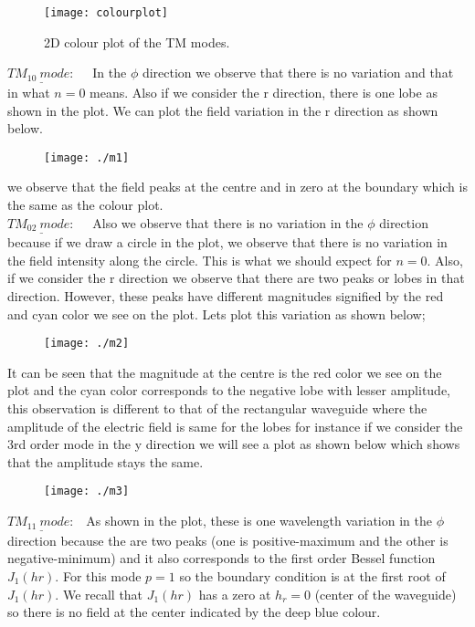       \begin{figure}[H]
      	\centering
      	\texttt{[image: colourplot]}
      	\caption{2D colour plot of the TM modes.}
      	\label{fig:colourplot}
      \end{figure}
      
      $\underline{TM_{10} \ mode:}$ \ \ In the $\phi$ direction we observe that there is no variation and that in what $n=0$ means. Also if we consider the r direction, there is one lobe as shown in the plot. We can plot the field variation  in the r direction as shown below.
      \begin{figure}[H]
      	\centering
      	\texttt{[image: ./m1]}
      	\caption{}
      	\label{fig:m1}
      \end{figure}
  	  we observe that the field peaks at the centre and in zero at the boundary which is the same as the colour plot.\\
      
      $\underline{TM_{02} \ mode:}$ \ \ Also we observe that there is no variation in the $\phi$ direction because if we draw a circle in the plot, we observe that there is no variation in the field intensity along the circle. This is what we should expect for $n =0$. Also, if we consider the r direction we observe that there are two peaks or lobes in that direction. However, these peaks have different magnitudes signified by the red and cyan color we see on the plot. Lets plot this variation as shown below;%
      \begin{figure}[H]
      	\centering
      	\texttt{[image: ./m2]}
      	\caption{}
      	\label{fig:m2}
      \end{figure}
      It can be seen that the magnitude at the centre is the red color we see on the plot and the cyan color corresponds to the negative lobe with lesser amplitude, this observation is different to that of the rectangular waveguide where the amplitude of the  electric field is same for the lobes for instance if we consider the 3rd order mode in the y direction we will see a plot as shown below which shows that the amplitude stays the same.
      \begin{figure}[H]
      	\centering
      	\texttt{[image: ./m3]}
      	\caption{}
      	\label{fig:m3}
      \end{figure}
      $\underline{TM_{11} \ mode:}$ \ As shown in the plot, these is one wavelength variation in the $\phi$ direction because the are two peaks (one is positive-maximum and the other is negative-minimum) and it also corresponds to the first order Bessel function $J_1(hr)$. For this mode $p =1$  so the boundary condition is at the first root of $J_1(hr).$ We recall that $J_1(hr)$ has a zero at $h_r =0$ (center of the waveguide) so there is no field  at the center indicated by the deep blue colour.\\
      
